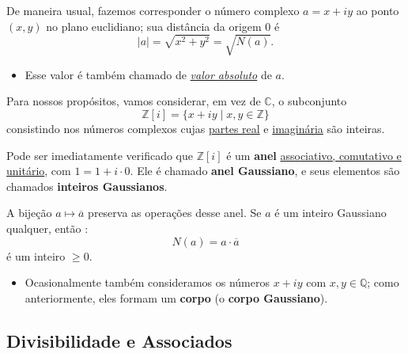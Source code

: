     De maneira usual, fazemos corresponder o número complexo 
    $a = x + iy$ ao ponto $(x,y)$ no plano euclidiano; sua distância da origem $0$ é
    \[
    |a| = \sqrt{x^2 + y^2} = \sqrt{N(a)}.
    \]

    \begin{itemize}[left=0.5cm, align=left, nosep]
        \item Esse valor é também chamado de \underline{\textit{valor absoluto}} de $a$.
    \end{itemize}

    Para nossos propósitos, vamos considerar, em vez de $\mathbb{C}$, o subconjunto 
    \[
    \mathbb{Z}[i] = \{x + iy \mid x, y \in \mathbb{Z}\}
    \]
    consistindo nos números complexos cujas \underline{partes real} e \underline{imaginária} são inteiras.  

    Pode ser imediatamente verificado que $\mathbb{Z}[i]$ é um \textbf{anel} \underline{associativo, comutativo e unitário}, com 
    $1 = 1 + i \cdot 0$. Ele é chamado \textbf{anel Gaussiano}, e seus elementos são chamados 
    \textbf{inteiros Gaussianos}.  

    \vspace{1cm}
    A bijeção $a \mapsto \overline{a}$ preserva as operações desse anel.  
    Se $a$ é um inteiro Gaussiano qualquer, então :
    \[
    N(a) = a \cdot \overline{a}
    \]
    é um inteiro $\geq 0$.  

    \begin{itemize}[left=0.5cm, align=left, nosep]
        \item Ocasionalmente também consideramos os números $x + iy$ com $x, y \in \mathbb{Q}$; como anteriormente, 
        eles formam um \textbf{corpo} (o \textbf{corpo Gaussiano}).  
    \end{itemize}
    
    \subsection{Divisibilidade e Associados}

